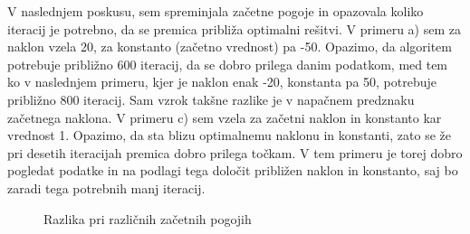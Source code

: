 \documentclass{article}
\begin{document}
\noindent V naslednjem poskusu, sem spreminjala začetne pogoje in opazovala koliko iteracij je potrebno, da se premica približa optimalni rešitvi. V primeru a) sem za naklon vzela 20, za konstanto (začetno vrednost) pa -50. Opazimo, da algoritem potrebuje približno 600 iteracij, da se dobro prilega danim podatkom, med tem ko v naslednjem primeru, kjer je naklon enak -20, konstanta pa 50, potrebuje približno 800 iteracij. Sam vzrok takšne razlike je v napačnem predznaku začetnega naklona. V primeru c) sem vzela za začetni naklon in konstanto kar vrednost 1. Opazimo, da sta blizu optimalnemu naklonu in konstanti, zato se že pri desetih iteracijah premica dobro prilega točkam. V tem primeru je torej dobro pogledat podatke in na podlagi tega določit približen naklon in konstanto, saj bo zaradi tega potrebnih manj iteracij.
\begin{figure}[!htb]
    \centering
    \caption{Razlika pri različnih začetnih pogojih}
    \label{fig:foobar}
\end{figure}
\end{document}
